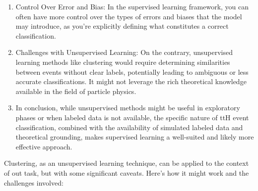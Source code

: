 \begin{enumerate}
    \item Control Over Error and Bias: In the supervised learning framework, you can often have more control over the
          types of errors and biases that the model may introduce, as you're explicitly defining what constitutes a
          correct classification.

    \item Challenges with Unsupervised Learning: On the contrary, unsupervised learning methods like clustering would
          require determining similarities between events without clear labels, potentially leading to ambiguous or less
          accurate classifications. It might not leverage the rich theoretical knowledge available in the field of
          particle physics.

    \item In conclusion, while unsupervised methods might be useful in exploratory phases or when labeled data is not
          available, the specific nature of ttH event classification, combined with the availability of simulated
          labeled data and theoretical grounding, makes supervised learning a well-suited and likely more effective
          approach.
\end{enumerate}

Clustering, as an unsupervised learning technique, can be applied to the context of out task, but with some significant
caveats. Here's how it might work and the challenges involved:

